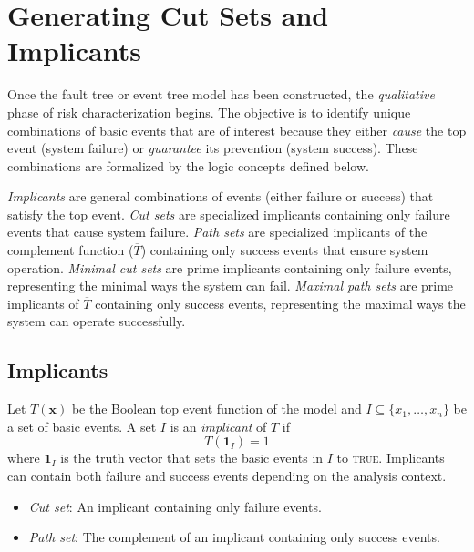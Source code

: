 \section{Generating Cut Sets and Implicants}


Once the fault tree or event tree model has been constructed, the \emph{qualitative} phase of risk characterization begins. The objective is to identify unique combinations of basic events that are of interest because they either \emph{cause} the top event (system failure) or \emph{guarantee} its prevention (system success). These combinations are formalized by the logic concepts defined below.

\emph{Implicants} are general combinations of events (either failure or success) that satisfy the top event. \emph{Cut sets} are specialized implicants containing only failure events that cause system failure. \emph{Path sets} are specialized implicants of the complement function ($\overline{T}$) containing only success events that ensure system operation. \emph{Minimal cut sets} are prime implicants containing only failure events, representing the minimal ways the system can fail. \emph{Maximal path sets} are prime implicants of $\overline{T}$ containing only success events, representing the maximal ways the system can operate successfully. 

\subsection{Implicants}
Let $T(\mathbf{x})$ be the Boolean top event function of the model and $I \subseteq \{x_1, \dots, x_n\}$ be a set of basic events. A set $I$ is an \emph{implicant} of $T$ if
\[
T(\mathbf{1}_I) = 1
\]
where $\mathbf{1}_I$ is the truth vector that sets the basic events in $I$ to \textsc{true}. Implicants can contain both failure and success events depending on the analysis context.

\begin{itemize}
  \item \emph{Cut set}: An implicant containing only failure events.
  \item \emph{Path set}: The complement of an implicant containing only success events.
\end{itemize}

